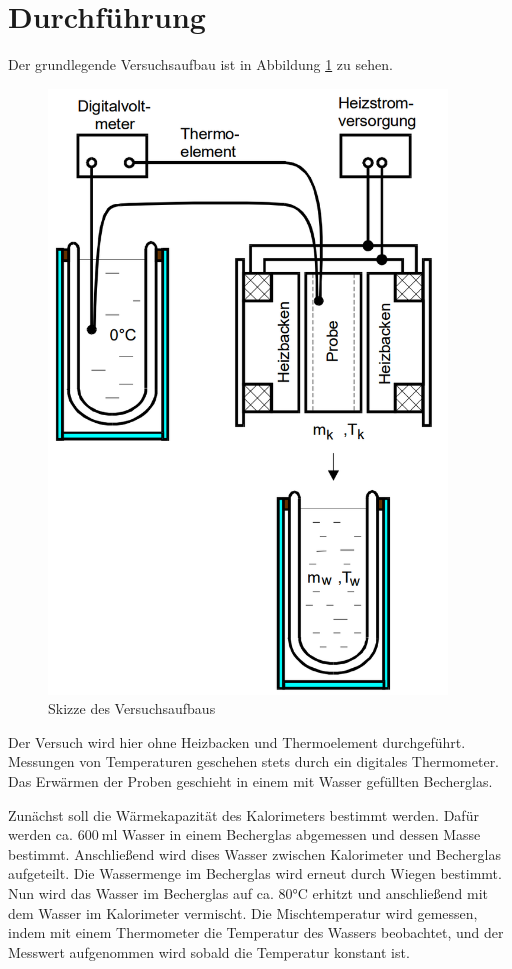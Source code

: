 \section{Durchführung}
\label{sec:Durchführung}
Der grundlegende Versuchsaufbau ist in Abbildung \ref{fig:aufbau} zu sehen.

\begin{figure}
  \centering
  \includegraphics[width=300pt]{data/aufbau.png}
  \caption{Skizze des Versuchsaufbaus \cite{Versuchsanleitung}}
  \label{fig:aufbau}
\end{figure}

Der Versuch wird hier ohne Heizbacken und Thermoelement durchgeführt. Messungen
von Temperaturen geschehen stets durch ein digitales Thermometer. Das Erwärmen der
Proben geschieht in einem mit Wasser gefüllten Becherglas.

Zunächst soll die Wärmekapazität des Kalorimeters bestimmt werden. Dafür werden ca.
$\SI{600}{\milli\litre}$ Wasser in einem Becherglas abgemessen und dessen Masse bestimmt. Anschließend
wird dises Wasser zwischen Kalorimeter
und Becherglas aufgeteilt. Die Wassermenge im Becherglas wird erneut durch Wiegen
bestimmt. Nun wird das Wasser im Becherglas auf ca. 80°C erhitzt und anschließend
mit dem Wasser im Kalorimeter vermischt. Die Mischtemperatur wird gemessen, indem
mit einem Thermometer die Temperatur des Wassers beobachtet, und der Messwert aufgenommen
wird sobald die Temperatur konstant ist.

